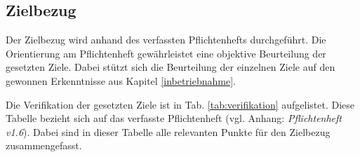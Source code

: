 \subsection{Zielbezug}
Der Zielbezug wird anhand des verfassten Pflichtenhefts durchgeführt. Die Orientierung am Pflichtenheft gewährleistet eine objektive Beurteilung der gesetzten Ziele. Dabei stützt sich die Beurteilung der einzelnen Ziele auf den gewonnen Erkenntnisse aus Kapitel \ref{inbetriebnahme}.
\newline

Die Verifikation der gesetzten Ziele ist in Tab. \ref{tab:verifikation} aufgelistet. Diese Tabelle bezieht sich auf das verfasste Pflichtenheft (vgl. Anhang: \textit{Pflichtenheft v1.6}). Dabei sind in dieser Tabelle alle relevanten Punkte für den Zielbezug zusammengefasst.

